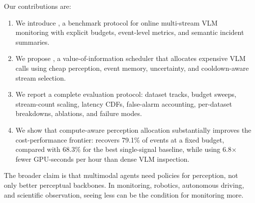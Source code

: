 Our contributions are:

\begin{enumerate}
    \item We introduce \benchmark, a benchmark protocol for online multi-stream VLM monitoring with explicit budgets, event-level metrics, and semantic incident summaries.
    \item We propose \method, a value-of-information scheduler that allocates expensive VLM calls using cheap perception, event memory, uncertainty, and cooldown-aware stream selection.
    \item We report a complete evaluation protocol: dataset tracks, budget sweeps, stream-count scaling, latency CDFs, false-alarm accounting, per-dataset breakdowns, ablations, and failure modes.
    \item We show that compute-aware perception allocation substantially improves the cost-performance frontier: \method{} recovers 79.1\% of events at a fixed budget, compared with 68.3\% for the best single-signal baseline, while using 6.8$\times$ fewer GPU-seconds per hour than dense VLM inspection.
\end{enumerate}

The broader claim is that multimodal agents need policies for perception, not only better perceptual backbones. In monitoring, robotics, autonomous driving, and scientific observation, seeing less can be the condition for monitoring more.
